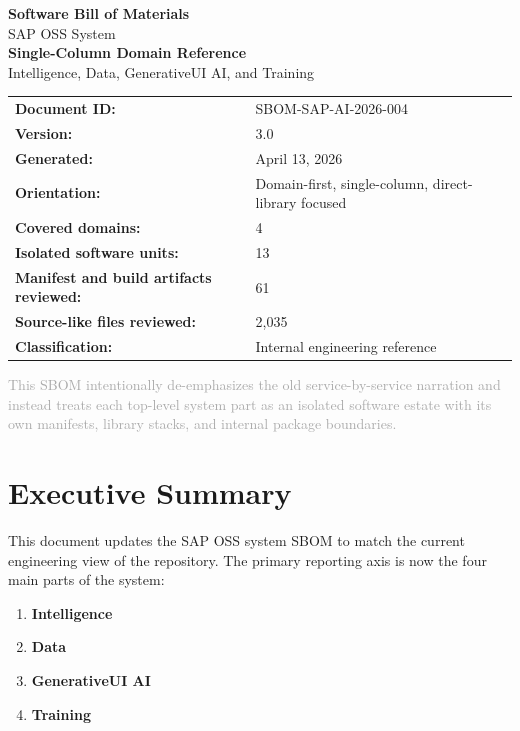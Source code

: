 \documentclass[11pt,a4paper]{article}
\begin{document}
\begin{titlepage}
\centering
\vspace*{1.5cm}
{\Huge\bfseries\textcolor{sapblue}{Software Bill of Materials}\\[0.4cm]}
{\LARGE SAP OSS System}\\[0.8cm]
{\Large\textbf{Single-Column Domain Reference}}\\[0.4cm]
{\large Intelligence, Data, GenerativeUI AI, and Training}\\[2.4cm]

\begin{tabular}{ll}
\textbf{Document ID:} & SBOM-SAP-AI-2026-004 \\
\textbf{Version:} & 3.0 \\
\textbf{Generated:} & April 13, 2026 \\
\textbf{Orientation:} & Domain-first, single-column, direct-library focused \\
\textbf{Covered domains:} & 4 \\
\textbf{Isolated software units:} & 13 \\
\textbf{Manifest and build artifacts reviewed:} & 61 \\
\textbf{Source-like files reviewed:} & 2,035 \\
\textbf{Classification:} & Internal engineering reference \\
\end{tabular}

\vfill
{\large\textcolor{darkgray}{This SBOM intentionally de-emphasizes the old service-by-service narration and instead treats each top-level system part as an isolated software estate with its own manifests, library stacks, and internal package boundaries.}}
\end{titlepage}

\tableofcontents
\newpage

\section{Executive Summary}

This document updates the SAP OSS system SBOM to match the current engineering view of the repository. The primary reporting axis is now the four main parts of the system:

\begin{enumerate}[leftmargin=1.4cm]
    \item \textbf{Intelligence}
    \item \textbf{Data}
    \item \textbf{GenerativeUI AI}
    \item \textbf{Training}
\end{enumerate}
\end{document}
